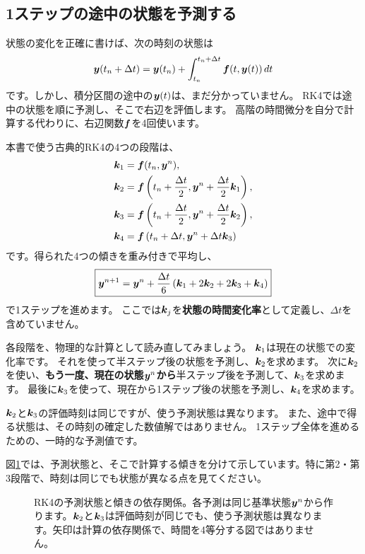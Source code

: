 \subsection{1ステップの途中の状態を予測する}

状態の変化を正確に書けば、次の時刻の状態は
\begin{equation}
\boldsymbol y(t_n+\Delta t)=\boldsymbol y(t_n)+\int_{t_n}^{t_n+\Delta t}\boldsymbol f(t,\boldsymbol y(t))\,dt
\label{eq:ch1-integral-form}
\end{equation}
です。しかし、積分区間の途中の$\boldsymbol y(t)$は、まだ分かっていません。
RK4では途中の状態を順に予測し、そこで右辺を評価します。
高階の時間微分を自分で計算する代わりに、右辺関数$\boldsymbol f$を4回使います。\cite{sugiura2009}

本書で使う古典的RK4の4つの段階は、
\begin{align}
\boldsymbol k_1 &= \boldsymbol f(t_n,\boldsymbol y^n),\nonumber\\
\boldsymbol k_2 &= \boldsymbol f\left(t_n+\frac{\Delta t}{2},\boldsymbol y^n+\frac{\Delta t}{2}\boldsymbol k_1\right),\nonumber\\
\boldsymbol k_3 &= \boldsymbol f\left(t_n+\frac{\Delta t}{2},\boldsymbol y^n+\frac{\Delta t}{2}\boldsymbol k_2\right),\nonumber\\
\boldsymbol k_4 &= \boldsymbol f\left(t_n+\Delta t,\boldsymbol y^n+\Delta t\boldsymbol k_3\right)
\label{eq:ch1-rk4-stages}
\end{align}
です。得られた4つの傾きを重み付きで平均し、
\begin{equation}
\boxed{\boldsymbol y^{n+1}=\boldsymbol y^n+\frac{\Delta t}{6}
\left(\boldsymbol k_1+2\boldsymbol k_2+2\boldsymbol k_3+\boldsymbol k_4\right)}
\label{eq:ch1-rk4-update}
\end{equation}
で1ステップを進めます。
ここでは$\boldsymbol k_j$を\textbf{状態の時間変化率}として定義し、$\Delta t$を含めていません。

各段階を、物理的な計算として読み直してみましょう。
$\boldsymbol k_1$は現在の状態での変化率です。
それを使って半ステップ後の状態を予測し、$\boldsymbol k_2$を求めます。
次に$\boldsymbol k_2$を使い、\textbf{もう一度、現在の状態$\boldsymbol y^n$から}半ステップ後を予測して、$\boldsymbol k_3$を求めます。
最後に$\boldsymbol k_3$を使って、現在から1ステップ後の状態を予測し、$\boldsymbol k_4$を求めます。

$\boldsymbol k_2$と$\boldsymbol k_3$の評価時刻は同じですが、使う予測状態は異なります。
また、途中で得る状態は、その時刻の確定した数値解ではありません。
1ステップ全体を進めるための、一時的な予測値です。


図\ref{fig:concept-ch1-rk4}では、予測状態と、そこで計算する傾きを分けて示しています。特に第2・第3段階で、時刻は同じでも状態が異なる点を見てください。
\begin{figure}[!htbp]
\centering

\caption{RK4の予測状態と傾きの依存関係。各予測は同じ基準状態$\boldsymbol y^n$から作ります。$\boldsymbol k_2$と$\boldsymbol k_3$は評価時刻が同じでも、使う予測状態は異なります。矢印は計算の依存関係で、時間を4等分する図ではありません。}
\label{fig:concept-ch1-rk4}
\end{figure}
\FloatBarrier

